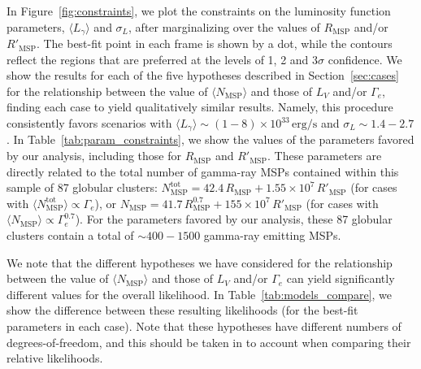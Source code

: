 In Figure~\ref{fig:constraints}, we plot the constraints on the luminosity function parameters, $\langle L_{\gamma} \rangle$ and $\sigma_L$, after marginalizing over the values of $R_\textrm{MSP}$ and/or $R'_\textrm{MSP}$. The best-fit point in each frame is shown by a dot, while the contours reflect the regions that are preferred at the levels of 1, 2 and 3$\sigma$ confidence. We show the results for each of the five hypotheses described in Section~\ref{sec:cases} for the relationship between the value of $\langle N_\textrm{MSP}\rangle$ and those of $L_V$ and/or $\Gamma_e$, finding each case to yield qualitatively similar results. Namely, this procedure consistently favors scenarios with $\langle L_{\gamma}\rangle \sim (1-8)\times 10^{33}\, \textrm{erg/s}$ and $\sigma_L \sim 1.4-2.7$. In Table~\ref{tab:param_constraints}, we show the values of the parameters favored by our analysis, including those for $R_\textrm{MSP}$ and $R'_\textrm{MSP}$. These parameters are directly related to the total number of gamma-ray MSPs contained within this sample of 87 globular clusters:  $N^\textrm{tot}_\textrm{MSP}=42.4 \, R_\textrm{MSP} + 1.55 \times 10^7 \, R'_\textrm{MSP}$ (for cases with $\langle N^\textrm{tot}_\textrm{MSP} \rangle \propto \Gamma_e$), or $N_\textrm{MSP}=41.7 \, R_\textrm{MSP}^{0.7} + 155 \times 10^7 \, R'_\textrm{MSP}$ (for cases with $\langle N_\textrm{MSP} \rangle \propto \Gamma_e^{0.7}$). For the parameters favored by our analysis, these 87 globular clusters contain a total of $\sim 400-1500$ gamma-ray emitting MSPs.

We note that the different hypotheses we have considered for the relationship between the value of $\langle N_\textrm{MSP}\rangle$ and those of $L_V$ and/or $\Gamma_e$ can yield significantly different values for the overall likelihood. In Table~\ref{tab:models_compare}, we show the difference between these resulting likelihoods (for the best-fit parameters in each case). Note that these hypotheses have different numbers of degrees-of-freedom, and this should be taken in to account when comparing their relative likelihoods.



